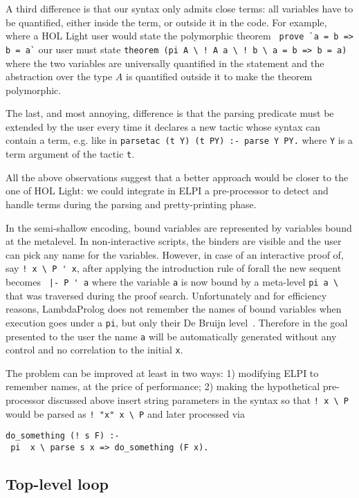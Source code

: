 \documentclass[preprint]{sigplanconf}
\begin{document}
A third difference is that our syntax only admits close terms: all variables have to be quantified, either inside the term, or outside it in the code. For example, where a HOL Light user would state the polymorphic theorem \verb+ prove `a = b => b = a`+ our user must state \verb+theorem (pi A \ ! A a \ ! b \ a = b => b = a)+ where the two variables are universally quantified in the statement and the abstraction over the type $A$ is quantified outside it to make the theorem polymorphic.

The last, and most annoying, difference is that the parsing predicate must be extended by the user every time it declares a new tactic whose syntax can contain a term, e.g. like in \texttt{parsetac (t Y) (t PY) :- parse Y PY.} where \verb+Y+ is a term argument of the tactic \verb+t+.

All the above observations suggest that a better approach would be closer to the one of HOL Light: we could integrate in ELPI a pre-processor to detect and handle terms during the parsing and pretty-printing phase.

In the semi-shallow encoding, bound variables are represented by variables bound at the metalevel. In non-interactive scripts, the binders are visible and the user can pick any name for the variables. However, in case of an interactive proof of, say \verb+! x \ P ' x+, after applying the introduction rule of forall the new sequent becomes \verb+ |- P ' a+ where the variable \verb+a+ is now bound by a meta-level \verb+pi a \ + that was traversed during the proof search. Unfortunately and for efficiency reasons, LambdaProlog does not remember the names of bound variables when execution goes under a \verb+pi+, but only their De Bruijn level~\cite{debrujn1}. Therefore in the goal presented to the user the name \verb+a+ will be automatically generated without any control and no correlation to the initial \verb+x+.

The problem can be improved at least in two ways: 1) modifying ELPI to remember names, at the price of performance; 2) making the hypothetical pre-processor discussed above insert string parameters in the syntax so that \verb+! x \ P+ would be parsed as \verb+! "x" x \ P+ and later processed via
{\small \begin{verbatim}
do_something (! s F) :-
 pi  x \ parse s x => do_something (F x).
\end{verbatim}}

\subsection{Top-level loop}
\end{document}
